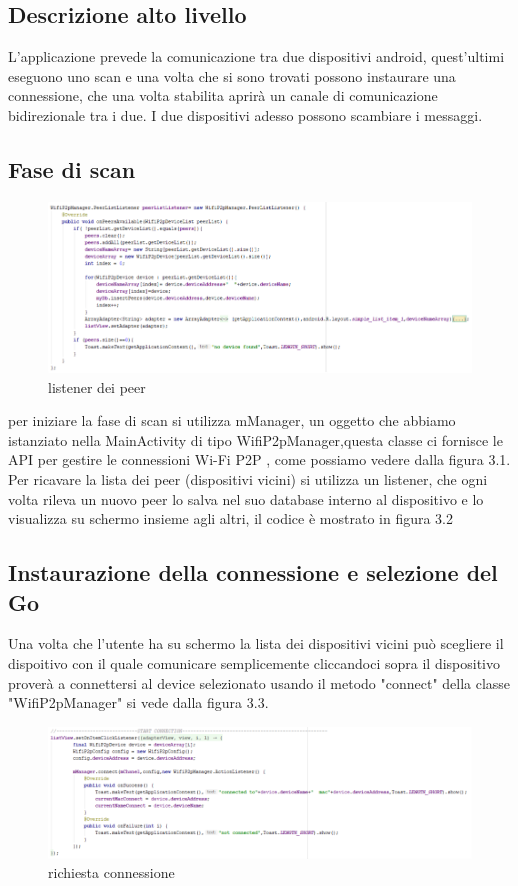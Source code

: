 \subsection{Descrizione alto livello}


L'applicazione prevede la comunicazione tra due dispositivi android,
quest'ultimi eseguono uno scan e una volta che si sono trovati 
possono instaurare una connessione,
che una volta stabilita aprirà un canale di comunicazione bidirezionale tra i due.
I due dispositivi adesso possono scambiare i messaggi.
\subsection{Fase di scan}
\begin{figure}
    \caption{listener dei peer}
    \centering
    \includegraphics[width=.49\columnwidth]{imgs/peerListener.png}%
\end{figure}

per iniziare la fase di scan si utilizza mManager, un
oggetto che abbiamo istanziato nella MainActivity
di tipo WifiP2pManager,questa classe ci fornisce le API per gestire le connessioni
Wi-Fi P2P \cite{androiddevelopers},
come possiamo vedere dalla figura 3.1.
Per ricavare la lista dei peer (dispositivi vicini)
 si utilizza un listener, 
che ogni volta rileva un nuovo peer lo salva nel suo database 
interno al dispositivo e lo 
visualizza su schermo insieme agli altri, il codice è mostrato
 in figura 3.2


\subsection{Instaurazione della connessione e selezione del Go}



Una volta che l'utente ha su schermo la lista dei dispositivi
vicini può scegliere il dispoitivo con il quale comunicare
semplicemente cliccandoci sopra il dispositivo proverà a 
connettersi al device selezionato usando il metodo "connect" 
della classe "WifiP2pManager" si vede dalla figura 3.3.
\begin{figure}
    \caption{richiesta connessione}
    \includegraphics[width=1.4\columnwidth]{imgs/Connect.png}
\end{figure}

